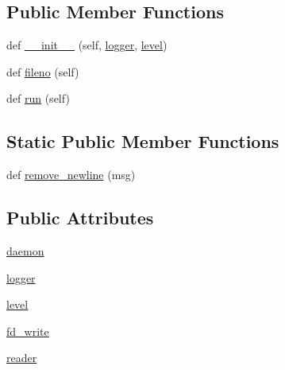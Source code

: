 \subsection*{Public Member Functions}
\begin{DoxyCompactItemize}
\item 
def \hyperlink{classpip_1_1__vendor_1_1pep517_1_1wrappers_1_1LoggerWrapper_a4deba781d963baa8e25376349c7f9569}{\+\_\+\+\_\+init\+\_\+\+\_\+} (self, \hyperlink{classpip_1_1__vendor_1_1pep517_1_1wrappers_1_1LoggerWrapper_ab555038d69a9e94137cc3d6ffc87504f}{logger}, \hyperlink{classpip_1_1__vendor_1_1pep517_1_1wrappers_1_1LoggerWrapper_a48348e81efb30816b7a3020541fdba8a}{level})
\item 
def \hyperlink{classpip_1_1__vendor_1_1pep517_1_1wrappers_1_1LoggerWrapper_ab8366f6ede26dba3293cfbd683f313c4}{fileno} (self)
\item 
def \hyperlink{classpip_1_1__vendor_1_1pep517_1_1wrappers_1_1LoggerWrapper_ab6bf4974da5986ec4cc3d09a362857b3}{run} (self)
\end{DoxyCompactItemize}
\subsection*{Static Public Member Functions}
\begin{DoxyCompactItemize}
\item 
def \hyperlink{classpip_1_1__vendor_1_1pep517_1_1wrappers_1_1LoggerWrapper_a738ed86306650cbed9544a5b7c10f1b6}{remove\+\_\+newline} (msg)
\end{DoxyCompactItemize}
\subsection*{Public Attributes}
\begin{DoxyCompactItemize}
\item 
\hyperlink{classpip_1_1__vendor_1_1pep517_1_1wrappers_1_1LoggerWrapper_ae2c834c8b604caf7dfea8895f4d2a9e8}{daemon}
\item 
\hyperlink{classpip_1_1__vendor_1_1pep517_1_1wrappers_1_1LoggerWrapper_ab555038d69a9e94137cc3d6ffc87504f}{logger}
\item 
\hyperlink{classpip_1_1__vendor_1_1pep517_1_1wrappers_1_1LoggerWrapper_a48348e81efb30816b7a3020541fdba8a}{level}
\item 
\hyperlink{classpip_1_1__vendor_1_1pep517_1_1wrappers_1_1LoggerWrapper_ace9994ae233eef79fdc67d104071fc0e}{fd\+\_\+write}
\item 
\hyperlink{classpip_1_1__vendor_1_1pep517_1_1wrappers_1_1LoggerWrapper_a024fb6c737de023c69905963f882a5bb}{reader}
\end{DoxyCompactItemize}


